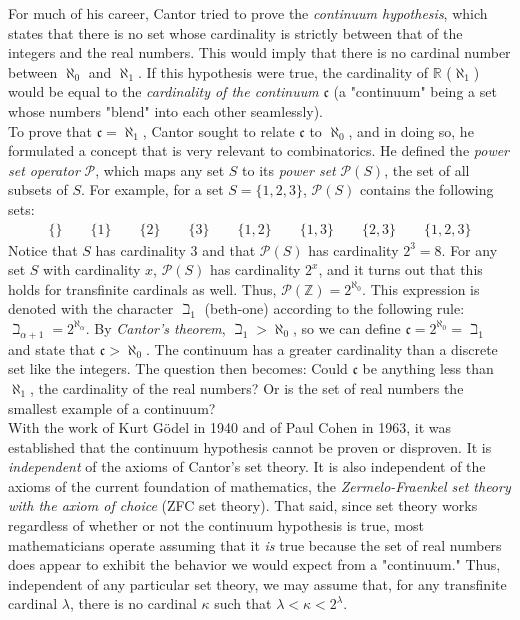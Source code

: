 For much of his career, Cantor tried to prove the \textit{continuum hypothesis}, which states that there is no set whose cardinality is strictly between that of the integers and the real numbers. This would imply that there is no cardinal number between $\aleph_0$ and $\aleph_1$. If this hypothesis were true, the cardinality of $\mathbb{R}$ ($\aleph_1$) would be equal to the \textit{cardinality of the continuum} $\mathfrak{c}$ (a "continuum" being a set whose numbers "blend" into each other seamlessly). \\

To prove that $\mathfrak{c}=\aleph_1$, Cantor sought to relate $\mathfrak{c}$ to $\aleph_0$, and in doing so, he formulated a concept that is very relevant to combinatorics. He defined the \textit{power set operator} $\mathcal{P}$, which maps any set $S$ to its \textit{power set} $\mathcal{P}(S)$, the set of all subsets of $S$. For example, for a set $S=\{1,2,3\}$, $\mathcal{P}(S)$ contains the following sets:
\begin{align*}
\{\}\qquad\{1\}\qquad\{2\}\qquad\{3\}\qquad\{1,2\}\qquad\{1,3\}\qquad\{2,3\}\qquad\{1,2,3\}
\end{align*}
Notice that $S$ has cardinality $3$ and that $\mathcal{P}(S)$ has cardinality $2^3=8$. For any set $S$ with cardinality $x$, $\mathcal{P}(S)$ has cardinality $2^x$, and it turns out that this holds for transfinite cardinals as well. Thus, $\mathcal{P}(\mathbb{Z})=2^{\aleph_0}$. This expression is denoted with the character $\beth_1$ (beth-one) according to the following rule: $\beth_{\alpha+1}=2^{\aleph_\alpha}$. By \textit{Cantor's theorem}, $\beth_1 > \aleph_0$, so we can define $\mathfrak{c}=2^{\aleph_0}=\beth_1$ and state that $\mathfrak{c} > \aleph_0$. The continuum has a greater cardinality than a discrete set like the integers. The question then becomes: Could $\mathfrak{c}$ be anything less than $\aleph_1$, the cardinality of the real numbers? Or is the set of real numbers the smallest example of a continuum? \\

With the work of Kurt G\"odel in 1940 and of Paul Cohen in 1963, it was established that the continuum hypothesis cannot be proven or disproven. It is \textit{independent} of the axioms of Cantor's set theory. It is also independent of the axioms of the current foundation of mathematics, the \textit{Zermelo-Fraenkel set theory with the axiom of choice} (ZFC set theory). That said, since set theory works regardless of whether or not the continuum hypothesis is true, most mathematicians operate assuming that it \textit{is} true because the set of real numbers does appear to exhibit the behavior we would expect from a "continuum." Thus, independent of any particular set theory, we may assume that, for any transfinite cardinal $\lambda$, there is no cardinal $\kappa$ such that $\lambda<\kappa<2^\lambda$. \\\\

